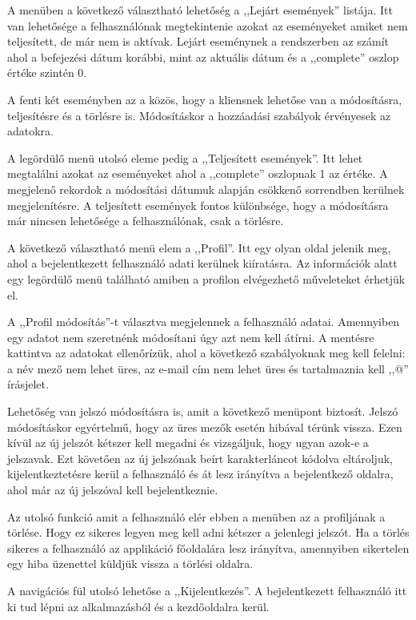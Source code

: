 \documentclass[
]{thesis-ekf}
\theoremstyle{definition}
\theoremstyle{remark}
\begin{document}
	A menüben a következő választható lehetőség a ,,Lejárt események'' listája. Itt van lehetősége a felhasználónak megtekintenie azokat az eseményeket amiket nem teljesített, de már nem is aktívak. Lejárt eseménynek a rendszerben az számít ahol a befejezési dátum korábbi, mint az aktuális dátum és a ,,complete'' oszlop értéke szintén 0. 
	
	A fenti két eseményben az a közös, hogy a kliensnek lehetőse van a módosításra, teljesítésre és a törlésre is. Módosításkor a hozzáadási szabályok érvényesek az adatokra.
	
	A legördülő menü utolsó eleme pedig a ,,Teljesített események''. Itt lehet megtalálni azokat az eseményeket ahol a ,,complete'' oszlopnak 1 az értéke. A megjelenő rekordok a módosítási dátumuk alapján csökkenő sorrendben kerülnek megjelenítésre. A teljesített események fontos különbsége, hogy a módosításra már nincsen lehetősége a felhasználónak, csak a törlésre.
	
	A következő választható menü elem a ,,Profil''. Itt egy olyan oldal jelenik meg, ahol a bejelentkezett felhasználó adati kerülnek kiíratásra. Az információk alatt egy legördülő menü található amiben a profilon elvégezhető műveleteket érhetjük el.
	
	A ,,Profil módosítás''-t választva megjelennek a felhasználó adatai. Amennyiben egy adatot nem szeretnénk módosítani úgy azt nem kell átírni. A mentésre kattintva az adatokat ellenőrízük,  ahol a következő szabályoknak meg kell felelni: a név mező nem lehet üres, az e-mail cím nem lehet üres és tartalmaznia kell ,,@'' írásjelet.
	
	Lehetőség van jelszó módosításra is, amit a következő menüpont biztosít. Jelszó módosításkor egyértelmű, hogy az üres mezők esetén hibával térünk vissza. Ezen kívül az új jelszót kétszer kell megadni és vizsgáljuk, hogy ugyan azok-e a jelszavak. Ezt követően az új jelszónak beírt karakterláncot kódolva eltároljuk, kijelentkeztetésre kerül a felhasználó és át lesz irányítva a bejelentkező oldalra, ahol már az új jelszóval kell bejelentkeznie.
	
	Az utolsó funkció amit a felhasználó elér ebben a menüben az a profiljának a törlése. Hogy ez sikeres legyen meg kell adni kétszer a jelenlegi jelszót. Ha a törlés sikeres a felhasználó az applikáció főoldalára lesz irányítva, amennyiben sikertelen egy hiba üzenettel küldjük vissza a törlési oldalra.
	
	A navigációs fül utolsó lehetőse a ,,Kijelentkezés''. A bejelentkezett felhasználó itt ki tud lépni az alkalmazásból és a kezdőoldalra kerül. 
	
\end{document}

